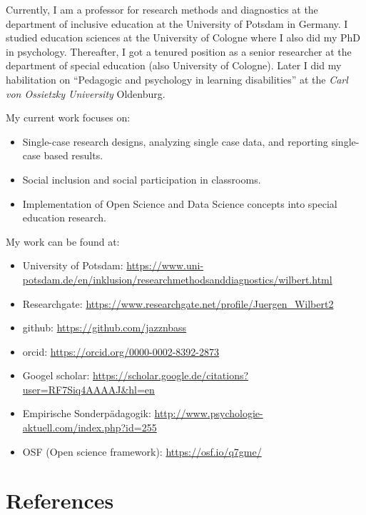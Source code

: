 \documentclass[
]{book}
\providecommand{\tightlist}{%
  \setlength{\itemsep}{0pt}\setlength{\parskip}{0pt}}
\begin{document}
Currently, I am a professor for research methods and diagnostics at the department of inclusive education at the University of Potsdam in Germany. I studied education sciences at the University of Cologne where I also did my PhD in psychology. Thereafter, I got a tenured position as a senior researcher at the department of special education (also University of Cologne). Later I did my habilitation on ``Pedagogic and psychology in learning disabilities'' at the \emph{Carl von Ossietzky University} Oldenburg.

My current work focuses on:

\begin{itemize}
\tightlist
\item
  Single-case research designs, analyzing single case data, and reporting single-case based results.
\item
  Social inclusion and social participation in classrooms.
\item
  Implementation of Open Science and Data Science concepts into special education research.
\end{itemize}

My work can be found at:

\begin{itemize}
\tightlist
\item
  University of Potsdam: \url{https://www.uni-potsdam.de/en/inklusion/researchmethodsanddiagnostics/wilbert.html}
\item
  Researchgate: \url{https://www.researchgate.net/profile/Juergen_Wilbert2}
\item
  github: \url{https://github.com/jazznbass}
\item
  orcid: \url{https://orcid.org/0000-0002-8392-2873}
\item
  Googel scholar: \url{https://scholar.google.de/citations?user=RF7Siq4AAAAJ\&hl=en}
\item
  Empirische Sonderpädagogik: \url{http://www.psychologie-aktuell.com/index.php?id=255}
\item
  OSF (Open science framework): \url{https://osf.io/q7gme/}
\end{itemize}

\hypertarget{references}{%
\chapter*{References}\label{references}}

  
\end{document}
